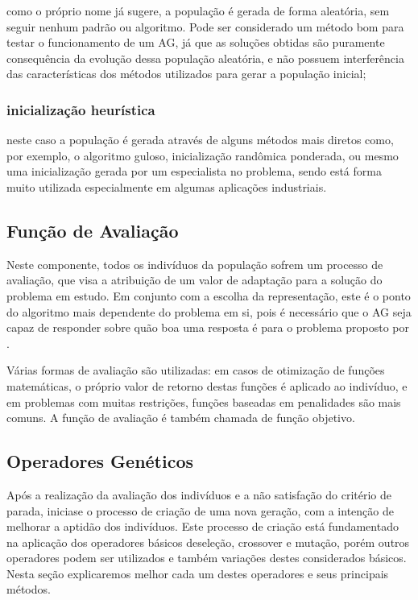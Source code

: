 como o próprio nome já sugere, a população é gerada de forma aleatória, sem seguir nenhum padrão ou algoritmo. Pode ser considerado um método bom para testar o funcionamento de um AG, já que as soluções obtidas são puramente consequência da evolução dessa população aleatória, e não possuem interferência das características dos métodos utilizados para gerar a população inicial;

\subsubsection{inicialização heurística}

neste caso a população é gerada através de alguns métodos mais diretos como, por exemplo, o algoritmo guloso, inicialização randômica ponderada, ou mesmo uma inicialização gerada por um especialista no problema, sendo está forma muito utilizada especialmente em algumas aplicações industriais.

\subsection{Função de Avaliação}


Neste componente, todos os indivíduos da população 
sofrem um processo de avaliação, que visa a atribuição de um valor de adaptação para a solução do problema em estudo. Em conjunto com a escolha da representação, este é o ponto do algoritmo mais dependente do problema em si, pois é necessário que o AG seja capaz de responder sobre quão boa uma resposta é para o problema proposto por \cite{goldberg02}. 

Várias formas de avaliação são utilizadas: em casos de otimização de funções matemáticas, o próprio valor de retorno destas funções é aplicado ao indivíduo, e em problemas com muitas restrições, funções baseadas em penalidades são mais comuns. A função de avaliação é também chamada de função objetivo. 


\subsection{Operadores Genéticos}

Após a realização da avaliação dos indivíduos e a não satisfação do critério de parada, iniciase o processo de criação de uma nova geração, com a intenção de melhorar a aptidão dos indivíduos. Este processo de criação está fundamentado na aplicação dos operadores básicos deseleção, crossover e mutação, porém outros operadores podem ser utilizados e também variações destes considerados básicos. Nesta seção explicaremos melhor cada um destes operadores e seus principais métodos.


